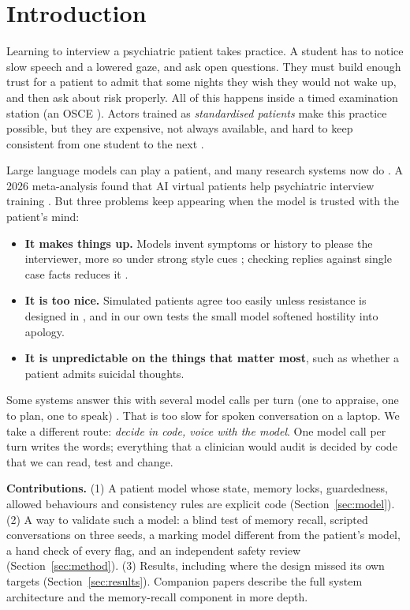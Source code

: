 \documentclass[twoside,11pt]{article}
\begin{document}
\section{Introduction}
Learning to interview a psychiatric patient takes practice. A student has to notice slow speech and a lowered gaze, and ask open questions. They must build enough trust for a patient to admit that some nights they wish they would not wake up, and then ask about risk properly. All of this happens inside a timed examination station (an OSCE \citep{harden1975osce}). Actors trained as \emph{standardised patients} make this practice possible, but
they are expensive, not always available, and hard to keep consistent from one student to the next \citep{piot2021simulation}.

Large language models can play a patient, and many research systems now do
\citep{chen2023llmempowered,wang2024patient,lee2025psyche,sabour2026patientact,sabour2026patienthub,louie2024roleplaydoh}. A 2026 meta-analysis
found that AI virtual patients help psychiatric interview training \citep{kilincel2026meta}. But three problems keep appearing when the
model is trusted with the patient's mind:
\begin{itemize}
\item \textbf{It makes things up.} Models invent symptoms or history to please the interviewer, more so under strong style cues \citep{chen2023llmempowered}; checking
replies against single case facts reduces it \citep{lai2025patientzero}.
\item \textbf{It is too nice.} Simulated patients agree too easily unless resistance is designed in \citep{steenstra2025scaffolding,lee2025psyche}, and in our
own tests the small model softened hostility into apology.
\item \textbf{It is unpredictable on the things that matter most}, such as whether a patient admits suicidal thoughts.
\end{itemize}

Some systems answer this with several model calls per turn (one to appraise, one to plan, one to speak) \citep{sabour2026patientact}. That is
too slow for spoken conversation on a laptop. We take a different route: \emph{decide in code, voice with the model}. One model call per turn
writes the words; everything that a clinician would audit is decided by code that we can read, test and change.

\textbf{Contributions.} (1) A patient model whose state, memory locks, guardedness, allowed behaviours and consistency rules are explicit code
(Section~\ref{sec:model}). (2) A way to validate such a model: a blind test of memory recall, scripted conversations on three seeds, a
marking model different from the patient's model, a hand check of every flag, and an independent safety review
(Section~\ref{sec:method}). (3) Results, including where the design missed its own targets (Section~\ref{sec:results}). Companion papers
describe the full system architecture and the memory-recall component in more depth.
\end{document}
